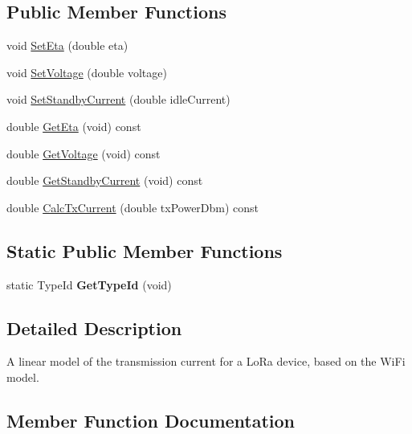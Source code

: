 \subsection*{Public Member Functions}
\begin{DoxyCompactItemize}
\item 
void \hyperlink{classns3_1_1lorawan_1_1LinearLoraTxCurrentModel_adde65b755e155cba2f3cf7dd676d19df}{Set\+Eta} (double eta)
\item 
void \hyperlink{classns3_1_1lorawan_1_1LinearLoraTxCurrentModel_a675cff436187a271b78832f938b1d404}{Set\+Voltage} (double voltage)
\item 
void \hyperlink{classns3_1_1lorawan_1_1LinearLoraTxCurrentModel_a1685530e7d61367adfab611f724f95ce}{Set\+Standby\+Current} (double idle\+Current)
\item 
double \hyperlink{classns3_1_1lorawan_1_1LinearLoraTxCurrentModel_a4e15519375a8f9b0a43cc5e437461e5a}{Get\+Eta} (void) const
\item 
double \hyperlink{classns3_1_1lorawan_1_1LinearLoraTxCurrentModel_a74f4d04511937d792a90c69997773d95}{Get\+Voltage} (void) const
\item 
double \hyperlink{classns3_1_1lorawan_1_1LinearLoraTxCurrentModel_a74cf9badafdd63a68f40f8d3cb9898cb}{Get\+Standby\+Current} (void) const
\item 
double \hyperlink{classns3_1_1lorawan_1_1LinearLoraTxCurrentModel_a665f1751a87d6ff09b30c4ca30484b92}{Calc\+Tx\+Current} (double tx\+Power\+Dbm) const
\end{DoxyCompactItemize}
\subsection*{Static Public Member Functions}
\begin{DoxyCompactItemize}
\item 
\mbox{\label{classns3_1_1lorawan_1_1LinearLoraTxCurrentModel_a910ea8ed64df92fcbd89e6a4b68ad03f}} 
static Type\+Id {\bfseries Get\+Type\+Id} (void)
\end{DoxyCompactItemize}


\subsection{Detailed Description}
A linear model of the transmission current for a Lo\+Ra device, based on the Wi\+Fi model. 

\subsection{Member Function Documentation}
\mbox{\label{classns3_1_1lorawan_1_1LinearLoraTxCurrentModel_a665f1751a87d6ff09b30c4ca30484b92}} 
